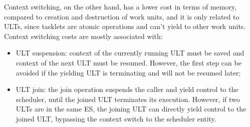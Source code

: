 Context switching, on the other hand, has a lower cost in terms of memory, compared to creation and destruction of work units, and it is only related to ULTs, since tasklets are atomic operations and can't yield to other work units. Context switching costs are mostly associated with:
\begin{itemize}
    \item ULT suspension: context of the currently running ULT must be saved and context of the next ULT must be resumed. However, the first step can be avoided if the yielding ULT is terminating and will not be resumed later;
    \item ULT join: the join operation suspends the caller and yield control to the scheduler, until the joined ULT terminates its execution. However, if two ULTs are in the same ES, the joining ULT can directly yield control to the joined ULT, bypassing the context switch to the scheduler entity.
\end{itemize}

